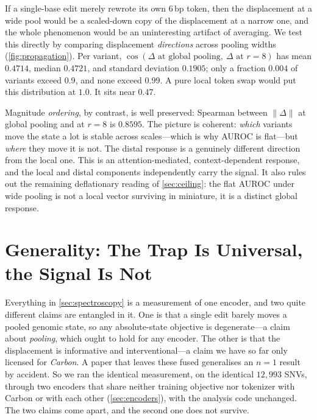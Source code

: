 \documentclass{article}
\newcommand{\D}{\Delta}
\begin{document}
If a single-base edit merely rewrote its own $6$\,bp token, then the displacement at a wide pool
would be a scaled-down copy of the displacement at a narrow one, and the whole phenomenon would be
an uninteresting artifact of averaging. We test this directly by comparing displacement
\emph{directions} across pooling widths (\cref{fig:propagation}). Per variant,
$\cos(\D\text{ at global pooling},\ \D\text{ at }r{=}8)$ has mean $0.4714$, median $0.4721$, and
standard deviation $0.1905$; only a fraction $0.004$ of variants exceed $0.9$, and none exceed
$0.99$. A pure local token swap would put this distribution at $1.0$. It sits near $0.47$.

Magnitude \emph{ordering}, by contrast, is well preserved: Spearman between $\lVert\D\rVert$ at
global pooling and at $r{=}8$ is $0.8595$. The picture is coherent: \emph{which} variants move the
state a lot is stable across scales---which is why AUROC is flat---but \emph{where} they move it is
not. The distal response is a genuinely different direction from the local one. This is an
attention-mediated, context-dependent response, and the local and distal components independently
carry the signal. It also rules out the remaining deflationary reading of \cref{sec:ceiling}: the
flat AUROC under wide pooling is not a local vector surviving in miniature, it is a distinct global
response.

\figPropagation

\section{Generality: The Trap Is Universal, the Signal Is Not}
\label{sec:generality}

Everything in \cref{sec:spectroscopy} is a measurement of one encoder, and two quite different
claims are entangled in it. One is that a single edit barely moves a pooled genomic state, so any
absolute-state objective is degenerate---a claim about \emph{pooling}, which ought to hold for any
encoder. The other is that the displacement is informative and interventional---a claim we have so
far only licensed for \emph{Carbon}. A paper that leaves these fused generalises an $n{=}1$ result
by accident. So we ran the identical measurement, on the identical $12{,}993$ SNVs, through two
encoders that share neither training objective nor tokenizer with Carbon or with each other
(\cref{sec:encoders}), with the analysis code unchanged. The two claims come apart, and the second
one does not survive.
\end{document}

